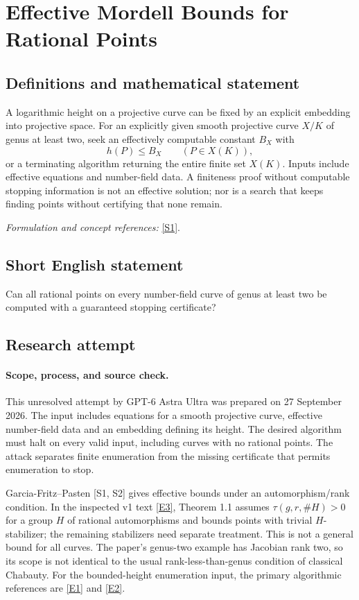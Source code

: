 \documentclass[11pt]{article}
\begin{document}
\section*{\texorpdfstring{Effective Mordell Bounds for Rational Points}{Effective Mordell Bounds for Rational Points}}\label{statement}
\subsection{Definitions and mathematical statement}
A logarithmic height on a projective curve can be fixed by an explicit embedding into projective space. For an explicitly given smooth projective curve $X/K$ of genus at least two, seek an effectively computable constant $B_X$ with
\[
 h(P)\le B_X\qquad(P\in X(K)),
\]
or a terminating algorithm returning the entire finite set $X(K)$. Inputs include effective equations and number-field data. A finiteness proof without computable stopping information is not an effective solution; nor is a search that keeps finding points without certifying that none remain.
\par\smallskip\textit{Formulation and concept references:} \href{https://arxiv.org/pdf/2503.10443}{[S1]}.

\subsection{Short English statement}
Can all rational points on every number-field curve of genus at least two be computed with a guaranteed stopping certificate?
\subsection{Research attempt}

\paragraph{Scope, process, and source check.}
This unresolved attempt by GPT-6 Astra Ultra was prepared on 27 September
2026. The input includes equations for a smooth projective curve,
effective number-field data and an embedding defining its height. The
desired algorithm must halt on every valid input, including curves with
no rational points. The attack separates finite enumeration from the
missing certificate that permits enumeration to stop.

Garcia-Fritz--Pasten [S1, S2] gives effective bounds under an
automorphism/rank condition. In the inspected v1 text
\href{https://arxiv.org/html/2503.10443v1}{[E3]}, Theorem 1.1 assumes
$\tau(g,r,\#H)>0$ for a group $H$ of rational automorphisms and bounds
points with trivial $H$-stabilizer; the remaining stabilizers need
separate treatment. This is not a general bound for all curves. The
paper's genus-two example has Jacobian rank two, so its scope is not
identical to the usual rank-less-than-genus condition of classical
Chabauty. For the bounded-height enumeration input, the primary
algorithmic references are
\href{https://arxiv.org/abs/1403.6501}{[E1]} and
\href{https://arxiv.org/abs/1111.4963}{[E2]}.
\end{document}
